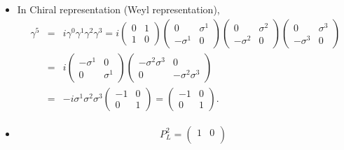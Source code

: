 \documentclass[11pt]{article}
\begin{document}
\section{ }
\begin{itemize}
    \item In Chiral representation (Weyl representation),
    \begin{eqnarray}
        \gamma^5 &=& i \gamma^0 \gamma^1 \gamma^2 \gamma^3 = i
        \begin{pmatrix}
            0 & 1\\
            1 & 0
        \end{pmatrix}
        \begin{pmatrix}
            0 & \sigma^1\\
            -\sigma^1 & 0
        \end{pmatrix}
        \begin{pmatrix}
            0 & \sigma^2\\
            -\sigma^2 & 0
        \end{pmatrix}
        \begin{pmatrix}
            0 & \sigma^3\\
            -\sigma^3 & 0
        \end{pmatrix}\\
        &=&i
        \begin{pmatrix}
            -\sigma^1&0\\
            0& \sigma^1 
        \end{pmatrix}
        \begin{pmatrix}
            -\sigma^2\sigma^3&0\\
            0&-\sigma^2\sigma^3
        \end{pmatrix} \\
        &=& -i \sigma^1\sigma^2\sigma^3
        \begin{pmatrix}
            -1 & 0\\
            0 & 1
        \end{pmatrix}
        =
        \begin{pmatrix}
            -1 & 0\\
            0 & 1
        \end{pmatrix}.
    \end{eqnarray}
    \item 
    \begin{eqnarray}
        &&P_L^2=
        \begin{pmatrix}
            1 & 0\\

\end{pmatrix}
\end{eqnarray}
\end{itemize}
\end{document}
